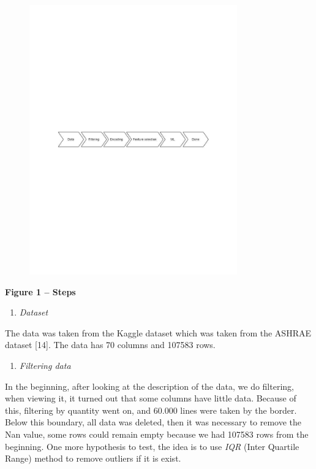 \begin{figure}[H]
	\centering
	\includegraphics[width=0.8\textwidth]{media/ict/image17}
	\caption*{}
\end{figure}


{\bfseries Figure 1 -- Steps}

\begin{enumerate}
\def\labelenumi{\Alph{enumi}.}
\item
  \emph{Dataset}
\end{enumerate}

The data was taken from the Kaggle dataset which was taken from the
ASHRAE dataset {[}14{]}. The data has 70 columns and 107583 rows.

\begin{enumerate}
\def\labelenumi{\Alph{enumi}.}
\setcounter{enumi}{1}
\item
  \emph{Filtering data}
\end{enumerate}

In the beginning, after looking at the description of the data, we do
filtering, when viewing it, it turned out that some columns have little
data. Because of this, filtering by quantity went on, and 60.000 lines
were taken by the border. Below this boundary, all data was deleted,
then it was necessary to remove the Nan value, some rows could remain
empty because we had 107583 rows from the beginning. One more hypothesis
to test, the idea is to use \emph{IQR} (Inter Quartile Range) method to
remove outliers if it is exist.

